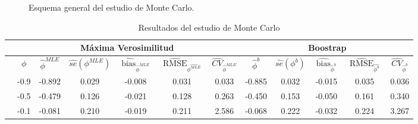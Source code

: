 \begin{figure}[h]
\begin{minipage}{0.45\textwidth}
    \caption{Esquema general del estudio de Monte Carlo.}
    \label{fig:monte_carlo_res2}
    \end{minipage}
\end{figure}

\begin{table}[h]
    \centering
    \caption{Resultados del estudio de Monte Carlo}
    \resizebox{18cm}{!} {
    \begin{tabular}{|c|cccccc|ccccc|}
    \hline
    \rowcolor[HTML]{FFFFFF} 
    \multicolumn{1}{|l|}{\cellcolor[HTML]{FFFFFF}} & \multicolumn{6}{c|}{\cellcolor[HTML]{FFFFFF}\textbf{Máxima Verosimilitud}} & \multicolumn{5}{c|}{\cellcolor[HTML]{FFFFFF}\textbf{Boostrap}} \\ \hline
    \rowcolor[HTML]{FFFFFF} 
    \multicolumn{1}{|l|}{\cellcolor[HTML]{FFFFFF}n} & \multicolumn{1}{c|}{\cellcolor[HTML]{FFFFFF}\textbf{$\phi$}} & \multicolumn{1}{c|}{\cellcolor[HTML]{FFFFFF}\textbf{$\hat{\phi}^{MLE}$}} & \multicolumn{1}{c|}{\cellcolor[HTML]{FFFFFF}\textbf{$\hat{se}(\phi^{MLE})$}} & \multicolumn{1}{c|}{\cellcolor[HTML]{FFFFFF}\textbf{$\widehat{\operatorname{bias}}_{\hat{\phi}^{MLE}}$}} & \multicolumn{1}{c|}{\cellcolor[HTML]{FFFFFF}\textbf{$\widehat{\operatorname{RMSE}}_{\hat{\phi^{MLE}}}$}} & \textbf{$\widehat{CV}_{\hat{\phi}^{MLE}}$} & \multicolumn{1}{c|}{\cellcolor[HTML]{FFFFFF}\textbf{$\hat{\phi}^{b}$}} & \multicolumn{1}{c|}{\cellcolor[HTML]{FFFFFF}\textbf{$\hat{se}(\phi^{b})$}} & \multicolumn{1}{c|}{\cellcolor[HTML]{FFFFFF}\textbf{$\widehat{\operatorname{bias}}_{\hat{\phi}^{b}}$}} & \multicolumn{1}{c|}{\cellcolor[HTML]{FFFFFF}\textbf{$\widehat{\operatorname{RMSE}}_{\hat{\phi^{b}}}$}} & \textbf{$\widehat{CV}_{\hat{\phi}^{b}}$} \\ \hline
     & \multicolumn{1}{c|}{-0.9} & \multicolumn{1}{c|}{-0.892} & \multicolumn{1}{c|}{0.029} & \multicolumn{1}{c|}{-0.008} & \multicolumn{1}{c|}{0.031} & 0.033 & \multicolumn{1}{c|}{-0.885} & \multicolumn{1}{c|}{0.032} & \multicolumn{1}{c|}{-0.015} & \multicolumn{1}{c|}{0.035} & 0.036 \\ \cline{2-12} 
     & \multicolumn{1}{c|}{-0.5} & \multicolumn{1}{c|}{-0.479} & \multicolumn{1}{c|}{0.126} & \multicolumn{1}{c|}{-0.021} & \multicolumn{1}{c|}{0.128} & 0.263 & \multicolumn{1}{c|}{-0.450} & \multicolumn{1}{c|}{0.153} & \multicolumn{1}{c|}{-0.050} & \multicolumn{1}{c|}{0.161} & 0.340 \\ \cline{2-12} 
     & \multicolumn{1}{c|}{-0.1} & \multicolumn{1}{c|}{-0.081} & \multicolumn{1}{c|}{0.210} & \multicolumn{1}{c|}{-0.019} & \multicolumn{1}{c|}{0.211} & 2.586 & \multicolumn{1}{c|}{-0.068} & \multicolumn{1}{c|}{0.222} & \multicolumn{1}{c|}{-0.032} & \multicolumn{1}{c|}{0.224} & 3.267 \\ \cline{2-12} 

\end{tabular}}
\end{table}
